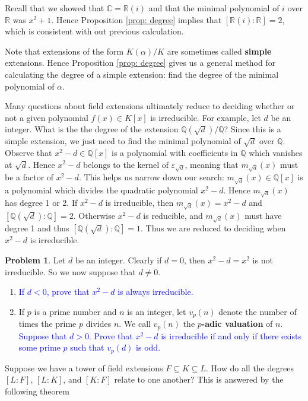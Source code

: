 \documentclass[11pt]{article}
\def\QQ{\mathbb{Q}}
\def\RR{\mathbb{R}}
\def\CC{\mathbb{C}}
\def\ve{\varepsilon}
\theoremstyle{definition}
\newtheorem{problem}{Problem}[section]
\numberwithin{equation}{subsection}
\newcommand{\blue}[1]{\textcolor{blue}{#1}}
\begin{document}
Recall that we showed that $\CC = \RR(i)$ and that the minimal polynomial of $i$ over $\RR$ was $x^2 + 1$.
Hence Proposition \ref{prop: degree} implies that $[\RR(i) : \RR] = 2$, which is consistent with out previous calculation.

Note that extensions of the form $K(\alpha)/K$ are sometimes called \textbf{simple} extensions.
Hence Proposition \ref{prop: degree} gives us a general method for calculating the degree of a simple extension: find the degree of the minimal polynomial of $\alpha$.

Many questions about field extensions ultimately reduce to deciding whether or not a given polynomial $f(x) \in K[x]$ is irreducible.
For example, let $d$ be an integer.
What is the the degree of the extension $\QQ(\sqrt{d})/\QQ$?
Since this is a simple extension, we just need to find the minimal polynomial of $\sqrt{d}$ over $\QQ$.
Observe that $x^2 - d \in \QQ[x]$ is a polynomial with coefficients in $\QQ$ which vanishes at $\sqrt{d}$.
Hence $x^2 - d$ belongs to the kernel of $\ve_{\sqrt{d}}$, meaning that $m_{\sqrt{d}}(x)$ must be a factor of $x^2 - d$.
This helps us narrow down our search: $m_{\sqrt{d}}(x) \in \QQ[x]$ is a polynomial which divides the quadratic polynomial $x^2 - d$.
Hence $m_{\sqrt{d}}(x)$ has degree 1 or 2.
If $x^2 - d$ is irreducible, then $m_{\sqrt{d}}(x) = x^2 - d$ and $[\QQ(\sqrt{d}) : \QQ] = 2$.
Otherwise $x^2 - d$ is reducible, and $m_{\sqrt{d}}(x)$ must have degree 1 and thus $[\QQ(\sqrt{d}) : \QQ] = 1$.
Thus we are reduced to deciding when $x^2 - d$ is irreducible.

\begin{problem}
    Let $d$ be an integer.
    Clearly if $d = 0$, then $x^2 - d = x^2$ is not irreducible.
    So we now suppose that $d \neq 0$.
    \begin{enumerate}
        \item \blue{If $d < 0$, prove that $x^2 - d$ is always irreducible.}

        \item 
        If $p$ is a prime number and $n$ is an integer, let $v_p(n)$ denote the number of times the prime $p$ divides $n$.
        We call $v_p(n)$ the \textbf{$p$-adic valuation} of $n$.
        \blue{Suppose that $d > 0$.
        Prove that $x^2 - d$ is irreducible if and only if there exists some prime $p$ such that $v_p(d)$ is odd.}
    \end{enumerate}
\end{problem}

Suppose we have a tower of field extensions $F \subseteq K \subseteq L$.
How do all the degrees $[L : F]$, $[L : K]$, and $[K : F]$ relate to one another?
This is answered by the following theorem
\end{document}
